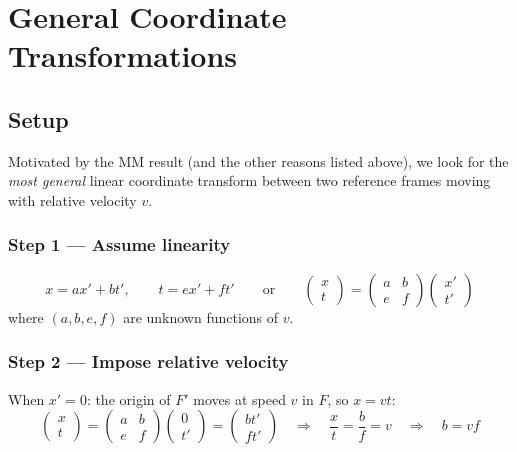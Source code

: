\section*{General Coordinate Transformations}

\subsection*{Setup}

Motivated by the MM result (and the other reasons listed above), we look for the
\emph{most general} linear coordinate transform between two reference frames
moving with relative velocity $v$.

\subsubsection*{Step 1 --- Assume linearity}

\[
  x = ax' + bt', \qquad t = ex' + ft'
  \qquad\text{or}\qquad
  \begin{pmatrix}x\\t\end{pmatrix} = \begin{pmatrix}a&b\\e&f\end{pmatrix}
  \begin{pmatrix}x'\\t'\end{pmatrix}
\]
where $(a,b,e,f)$ are unknown functions of $v$.

\subsubsection*{Step 2 --- Impose relative velocity}

When $x'=0$: the origin of $F'$ moves at speed $v$ in $F$, so $x = vt$:
\[
  \begin{pmatrix}x\\t\end{pmatrix}
  = \begin{pmatrix}a&b\\e&f\end{pmatrix}\begin{pmatrix}0\\t'\end{pmatrix}
  = \begin{pmatrix}bt'\\ft'\end{pmatrix}
  \quad\Rightarrow\quad \frac{x}{t} = \frac{b}{f} = v
  \quad\Rightarrow\quad b = vf
\]


